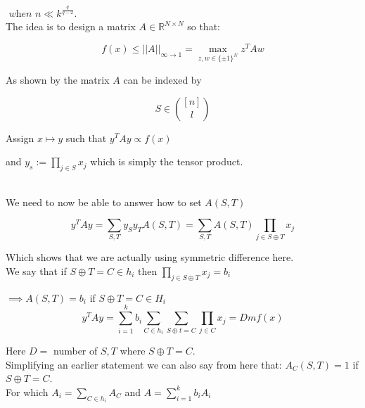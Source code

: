 \documentclass{article}
\begin{document}
\noindent $\textit{ when } n \ll k^{\frac{q}{q-2}}$.\\

\noindent The idea is to design a matrix $A \in \mathbb{R}^{N \times N}$ so that:

\begin{equation*}
f(x) \leq ||A||_{\infty \to 1} = \max_{z,w \in \{ \pm 1 \}^N} z^TAw
\end{equation*}

\noindent As shown by \citet{https://doi.org/10.48550/arxiv.1904.03858} the matrix $A$ can be indexed by

\begin{equation*}
S \in {[n] \choose l}
\end{equation*}

\noindent Assign $x \mapsto y$ such that $y^TAy \propto f(x)$

\noindent and $y_s := \displaystyle\prod_{j \in S} x_j$ which is simply the tensor product.\\\

\noindent We need to now be able to answer how to set $A(S,T)$

\begin{equation}
y^TAy = \sum_{S,T} y_Sy_TA(S,T) = \sum_{S,T} A(S,T) \displaystyle\prod_{j \in S \oplus T} x_j
\end{equation}

\noindent Which shows that we are actually using symmetric difference here.\\

\noindent We say that if $S \oplus T = C \in h_i$ then $\displaystyle\prod_{j \in S \oplus T} x_j = b_i$

\noindent $\implies A(S,T) = b_i$ if $S \oplus T = C \in H_i$\\

\begin{equation}
y^TAy = \sum_{i=1}^k b_i \sum_{C \in h_i} \sum_{S \oplus t = C} \displaystyle\prod_{j \in C}x_j = Dmf(x)
\end{equation}

\noindent Here $D =$ number of $S,T$ where $S \oplus T = C$.\\

\noindent Simplifying an earlier statement we can also say from here that: $A_C(S,T) = 1$ if $S \oplus T = C$.\\

\noindent For which $A_i = \sum_{C \in h_i} A_C$ and $A = \sum_{i=1}^k b_i A_i$\\
\end{document}
